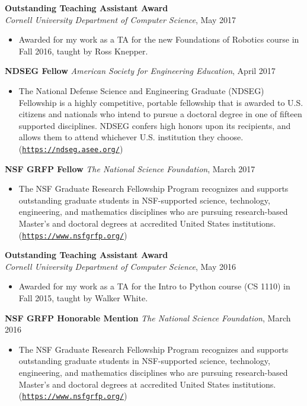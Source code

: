\documentclass[10pt]{article}
\renewcommand{\section}[1]{\pagebreak[3]%
	\hyphenpenalty=10000%
	\vspace{1.3\baselineskip}%
	\phantomsection\addcontentsline{toc}{section}{#1}%
	\noindent\llap{\scshape\smash{\parbox[t]{\marginparwidth}{\raggedright #1}}}%
	\vspace{-\baselineskip}\par}
\newenvironment{innerlist}[1][\enskip\textbullet]%
{\begin{itemize}[#1,leftmargin=*,parsep=0pt,itemsep=0pt,topsep=0pt,partopsep=0pt]}
		{\end{itemize}}
\providecommand*\url[1]{\href{#1}{#1}}
\renewcommand*\url[1]{\href{#1}{\texttt{#1}}}
\begin{document}
\section{Awards}

\textbf{Outstanding Teaching Assistant Award}\\\textit{Cornell University Department of Computer Science}, May 2017
\begin{innerlist}
	\item[] Awarded for my work as a TA for the new Foundations of Robotics course in Fall 2016,
	taught by Ross Knepper.
\end{innerlist}\bigskip

\textbf{NDSEG Fellow} \hfill \textit{American Society for Engineering Education}, April 2017
\begin{innerlist}
	\item[] The National Defense Science and Engineering Graduate (NDSEG) Fellowship is a highly
	competitive, portable fellowship that is awarded to U.S. citizens and nationals who intend to
	pursue a doctoral degree in one of fifteen supported disciplines. NDSEG confers high honors
	upon its recipients, and allows them to attend whichever U.S. institution they choose.
	(\url{https://ndseg.asee.org/})
\end{innerlist}\bigskip

\textbf{NSF GRFP Fellow} \hfill \textit{The National Science Foundation}, March 2017
\begin{innerlist}
	\item[] The NSF Graduate Research Fellowship Program recognizes and supports outstanding
	graduate students in NSF-supported science, technology, engineering, and mathematics
	disciplines who are pursuing research-based Master's and doctoral degrees at accredited United
	States institutions. (\url{https://www.nsfgrfp.org/})
\end{innerlist}\bigskip

\textbf{Outstanding Teaching Assistant Award}\\\textit{Cornell University Department of Computer Science}, May 2016
\begin{innerlist}
	\item[] Awarded for my work as a TA for the Intro to Python course (CS 1110) in Fall 2015,
	taught by Walker White.
\end{innerlist}\bigskip

\textbf{NSF GRFP Honorable Mention} \hfill \textit{The National Science Foundation}, March 2016
\begin{innerlist}
	\item[] The NSF Graduate Research Fellowship Program recognizes and supports outstanding
	graduate students in NSF-supported science, technology, engineering, and mathematics
	disciplines who are pursuing research-based Master's and doctoral degrees at accredited United
	States institutions.(\url{https://www.nsfgrfp.org/})
\end{innerlist}\bigskip
\end{document}
